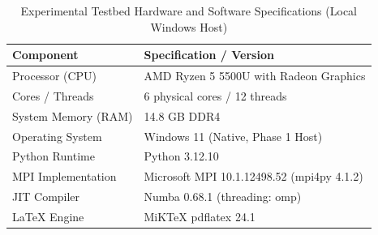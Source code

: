 \begin{table}[htbp]
\centering
\small
\caption{Experimental Testbed Hardware and Software Specifications (Local Windows Host)}
\label{tab:environment}
\begin{tabular}{ll}
\hline
\textbf{Component} & \textbf{Specification / Version} \\
\hline
Processor (CPU) & AMD Ryzen 5 5500U with Radeon Graphics \\
Cores / Threads & 6 physical cores / 12 threads \\
System Memory (RAM) & 14.8 GB DDR4 \\
Operating System & Windows 11 (Native, Phase 1 Host) \\
Python Runtime & Python 3.12.10 \\
MPI Implementation & Microsoft MPI 10.1.12498.52 (mpi4py 4.1.2) \\
JIT Compiler & Numba 0.68.1 (threading: omp) \\
LaTeX Engine & MiKTeX pdflatex 24.1 \\
\hline
\end{tabular}
\end{table}
